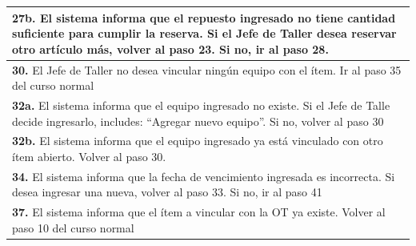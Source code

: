 \documentclass[12pt]{extarticle}
\begin{document}
\begin{spacing}{1.2}
\begin{longtable}{ |p{8cm}|p{8cm}| }
        \hline
        \multicolumn{2}{|p{16cm}|}{\textbf{27b. }El sistema informa que el repuesto ingresado no tiene cantidad suficiente para cumplir la reserva. Si el Jefe de Taller desea reservar otro artículo más, volver al paso 23. Si no, ir al paso 28.}\\
        \hline
        \multicolumn{2}{|p{16cm}|}{\textbf{30. }El Jefe de Taller no desea vincular ningún equipo con el ítem. Ir al paso 35 del curso normal}\\
        \hline
        \multicolumn{2}{|p{16cm}|}{\textbf{32a. }El sistema informa que el equipo ingresado no existe. Si el Jefe de Talle decide ingresarlo, includes: ``Agregar nuevo equipo''. Si no, volver al paso 30}\\
        \hline
        \multicolumn{2}{|p{16cm}|}{\textbf{32b. }El sistema informa que el equipo ingresado ya está vinculado con otro ítem abierto. Volver al paso 30.}\\
        \hline
        \multicolumn{2}{|p{16cm}|}{\textbf{34. }El sistema informa que la fecha de vencimiento ingresada es incorrecta. Si desea ingresar una nueva, volver al paso 33. Si no, ir al paso 41}\\
        \hline  
        \multicolumn{2}{|p{16cm}|}{\textbf{37. }El sistema informa que el ítem a vincular con la OT ya existe. Volver al paso 10 del curso normal}\\
    \hline  
\end{longtable}


\raya

\resetinc



\end{spacing}
\end{document}
